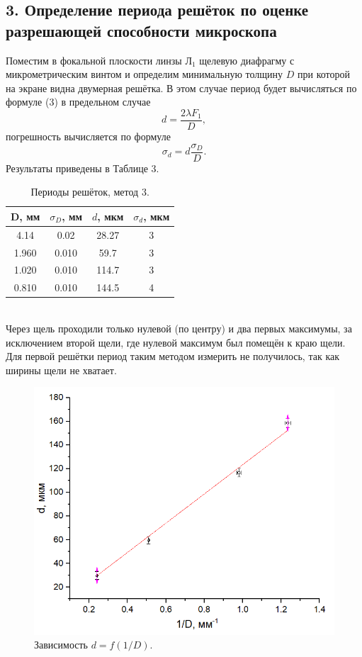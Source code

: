 \documentclass[a4paper,12pt]{article}
\begin{document}
\subsection*{3. Определение периода решёток по оценке разрешающей способности микроскопа}
Поместим в фокальной плоскости линзы $\text{Л}_1$ щелевую диафрагму с микрометрическим винтом и определим минимальную толщину $D$ при которой на экране видна двумерная решётка. В этом случае период будет вычисляться по формуле (3) в предельном случае
$$
d = \dfrac{2\lambda F_1}{D},
$$
погрешность вычисляется по формуле 
$$
\sigma_d = d \dfrac{\sigma_D}{D}.
$$
Результаты приведены в Таблице 3.
\begin{table}[h]
\begin{tabular}{|c|c|c|c|}
\hline
D, мм & $\sigma_D$, мм & $d$, мкм & $\sigma_d$, мкм \\ \hline
4.14  & 0.02           & 28.27    & 3            \\ \hline
1.960 & 0.010          & 59.7     & 3             \\ \hline
1.020 & 0.010          & 114.7    & 3             \\ \hline
0.810 & 0.010          & 144.5    & 4             \\ \hline
\end{tabular}
\centering
\caption{Периоды решёток, метод 3.}
\end{table}\\
Через щель проходили только нулевой (по центру) и два первых максимумы, за исключением второй щели, где нулевой максимум был помещён к краю щели. Для первой решётки период таким методом измерить не получилось, так как ширины щели не хватает.
\newpage
\begin{figure}[h]
\includegraphics[scale=0.7]{2.png}
\centering
\caption{Зависимость $d = f(1/D)$.}
\end{figure}
\end{document}
